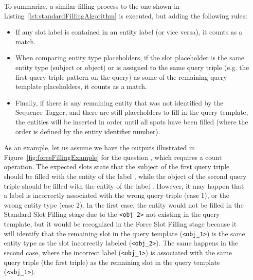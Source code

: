 To summarize, a similar filling process to the one shown in Listing~\ref{lst:standardFillingAlgorithm} 
is executed, but adding the following rules:
\begin{itemize}
    \item If any slot label is contained in an entity label (or vice versa), it counts as a 
    match.
    \item When comparing entity type placeholders, if the slot placeholder is the same entity 
    type (subject or object) or is assigned to the same query triple (e.g. the first query 
    triple pattern on the \SPARQL{} query) as some of the remaining query template placeholders, 
    it counts as a match.
    \item Finally, if there is any remaining entity that was not identified by the Sequence 
    Tagger, and there are still placeholders to fill in the query template, the entities will 
    be inserted in order until all spots have been filled (where the order is defined by the 
    entity identifier number).
\end{itemize}

As an example, let us assume we have the outputs illustrated in Figure~\ref{fig:forceFillingExample} 
for the question , which requires a 
count operation. The expected slots state that the subject of the first query triple should 
be filled with the entity of the label , while the object of the 
second query triple should be filled with the entity of the label . 
However, it may happen that a label is incorrectly associated with the wrong query triple 
(case 1), or the wrong entity type (case 2). In the first case, the  
entity would not be filled in the Standard Slot Filling stage due to the \texttt{<obj\_2>} 
not existing in the query template, but it would be recognized in the Force Slot Filling 
stage because it will identify that the remaining slot in the query template (\texttt{<obj\_1>}) 
is the same entity type as the slot incorrectly labeled (\texttt{<obj\_2>}). The same happens 
in the second case, where the incorrect label (\texttt{<obj\_1>}) is associated with the same 
query triple (the first triple) as the remaining slot in the query template (\texttt{<sbj\_1>}).

